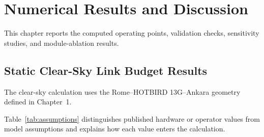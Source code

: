 
\section{Numerical Results and Discussion}

This chapter reports the computed operating points, validation checks, sensitivity studies, and module-ablation results.

\subsection{Static Clear-Sky Link Budget Results}
The clear-sky calculation uses the Rome--HOTBIRD 13G--Ankara geometry defined in Chapter~1.

Table~\ref{tab:assumptions} distinguishes published hardware or operator values from model assumptions and explains how each value enters the calculation.

